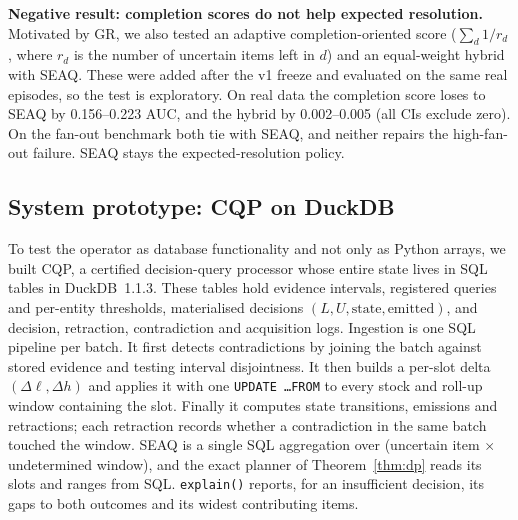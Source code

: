 \documentclass[conference]{IEEEtran}
\newcommand{\seaq}{SEAQ\xspace}
\begin{document}
\textbf{Negative result: completion scores do not help expected resolution.} Motivated by GR, we also tested an
adaptive completion-oriented score ($\sum_d 1/r_d$, where $r_d$ is the number of uncertain items left in $d$) and an
equal-weight hybrid with \seaq{}. These were added after the v1 freeze and evaluated on the same real episodes, so the
test is exploratory. On real data the completion score loses to \seaq{} by 0.156--0.223 AUC, and the hybrid by
0.002--0.005 (all CIs exclude zero). On the fan-out benchmark both tie with \seaq{}, and neither repairs the
high-fan-out failure. \seaq{} stays the expected-resolution policy.

\subsection{System prototype: CQP on DuckDB}
\label{sec:cqp}
To test the operator as database functionality and not only as Python arrays, we built CQP, a certified
decision-query processor whose entire state lives in SQL tables in DuckDB~1.1.3. These tables hold evidence intervals,
registered queries and per-entity thresholds, materialised decisions $(L,U,\text{state},\text{emitted})$, and decision,
retraction, contradiction and acquisition logs. Ingestion is one SQL pipeline per batch. It first detects
contradictions by joining the batch against stored evidence and testing interval disjointness. It then builds a
per-slot delta $(\Delta\ell,\Delta h)$ and applies it with one \texttt{UPDATE \dots FROM} to every stock and roll-up window
containing the slot. Finally it computes state transitions, emissions and retractions; each retraction records whether a
contradiction in the same batch touched the window. \seaq{} is a single SQL aggregation over (uncertain item
$\times$ undetermined window), and the exact planner of Theorem~\ref{thm:dp} reads its slots and ranges from SQL.
\texttt{explain()} reports, for an insufficient decision, its gaps to both outcomes and its widest contributing items.
\end{document}

